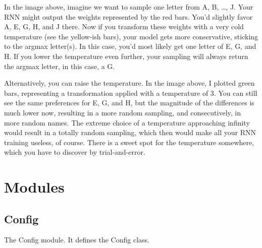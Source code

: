 \documentclass[letterpaper,10pt,english]{sphinxmanual}
\let\sphinxpxdimen\pdfpxdimen\else\newdimen\sphinxpxdimen
\begin{document}
\noindent\sphinxincludegraphics[width=600\sphinxpxdimen]{{temperature}.png}

In the image above, imagine we want to sample one letter from A, B, …, J. Your
RNN might output the weights represented by the red bars. You’d slightly favor
A, E, G, H, and J there. Now if you transform these weights with a very cold
temperature (see the yellow-ish bars), your model gets more conservative,
sticking to the argmax letter(s). In this case, you’d most likely get one letter
of E, G, and H. If you lower the temperature even further, your sampling will
always return the argmax letter, in this case, a G.

Alternatively, you can raise the temperature. In the image above, I plotted
green bars, representing a transformation applied with a temperature of 3. You
can still see the same preferences for E, G, and H, but the magnitude of the
differences is much lower now, resulting in a more random sampling, and
consecutively, in more random names. The extreme choice of a temperature
approaching infinity would result in a totally random sampling, which then would
make all your RNN training useless, of course. There is a sweet spot for the
temperature somewhere, which you have to discover by trial-and-error.


\chapter{Modules}
\label{\detokenize{modules:modules}}\label{\detokenize{modules::doc}}

\section{Config}
\label{\detokenize{modules:module-sng.Config}}\label{\detokenize{modules:config}}
The Config module. It defines the Config class.
\end{document}
